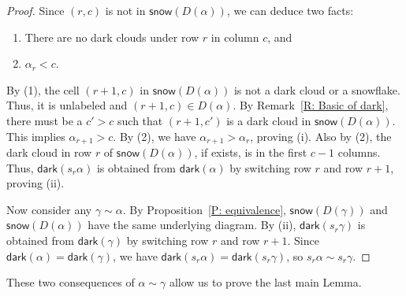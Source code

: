 \documentclass[ALCO]{cedram}
\newcommand{\dark}{\mathsf{dark}}
\newcommand{\snow}{\mathsf{snow}}
\begin{document}
\begin{proof}
Since $(r,c)$ is not in $\snow(D(\alpha))$,
we can deduce two facts:
\begin{enumerate}
\item There are no dark clouds under row $r$ in column $c$, and 
\item $\alpha_r < c$.
\end{enumerate}

By (1), the cell $(r+1,c)$ in $\snow(D(\alpha))$ 
is not a dark cloud or a snowflake.
Thus, it is unlabeled and $(r+1,c) \in D(\alpha)$.
By Remark~\ref{R: Basic of dark},
there must be a $c' > c$
such that $(r+1, c')$ is a dark cloud 
in $\snow(D(\alpha))$.
This implies $\alpha_{r+1} > c$.
By (2), 
we have $\alpha_{r+1} > \alpha_r$, 
proving (i).
Also by (2), 
the dark cloud in row $r$ of 
$\snow(D(\alpha))$,
if exists, 
is in the first $c-1$ columns. 
Thus, $\dark(s_r\alpha)$ is obtained
from $\dark(\alpha)$ by switching 
row $r$ and row $r+1$, proving (ii).

Now consider any  $\gamma \sim \alpha$.
By Proposition~\ref{P: equivalence},
$\snow(D(\gamma))$ and $\snow(D(\alpha))$
have the same underlying diagram.
By (ii), 
$\dark(s_r\gamma)$ is obtained
from $\dark(\gamma)$ by switching 
row $r$ and row $r+1$.
Since $\dark(\alpha) = \dark(\gamma)$,
we have $\dark(s_r\alpha) = \dark(s_r\gamma)$,
so $s_r \alpha \sim s_r \gamma$.
\end{proof}


These two consequences of $\alpha \sim \gamma$
allow us to prove the last main Lemma. 
\end{document}
